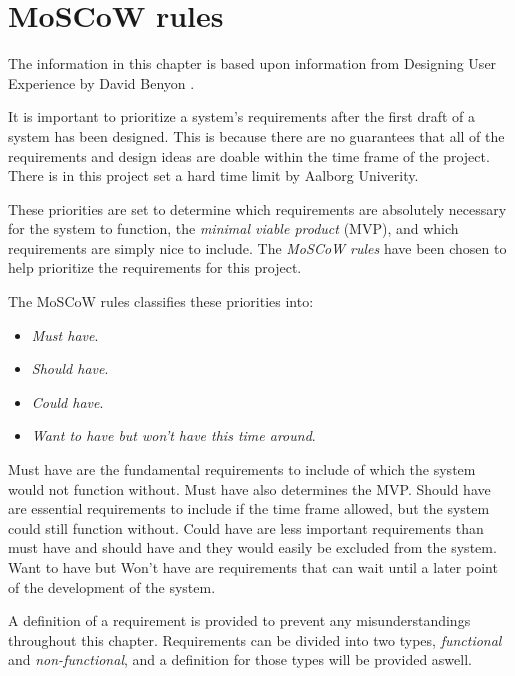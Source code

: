 \section{MoSCoW rules}
The information in this chapter is based upon information from Designing User Experience by David Benyon \cite{Benyon}.

It is important to prioritize a system's requirements after the first draft of a system has been designed.
This is because there are no guarantees that all of the requirements and design ideas are doable within the time frame of the project.
There is in this project set a hard time limit by Aalborg Univerity.

These priorities are set to determine which requirements are absolutely necessary for the system to function, the \textit{minimal viable product} (MVP), and which requirements are simply nice to include.
The \textit{MoSCoW rules} have been chosen to help prioritize the requirements for this project.

The MoSCoW rules classifies these priorities into:

\begin{itemize}
    \item \textit{Must have}.
    \item \textit{Should have}.
    \item \textit{Could have}.
    \item \textit{Want to have but won’t have this time around}.
\end{itemize}

Must have are the fundamental requirements to include of which the system would not function without.
Must have also determines the MVP.
Should have are essential requirements to include if the time frame allowed, but the system could still function without.
Could have are less important requirements than must have and should have and they would easily be excluded from the system.
Want to have but Won't have are requirements that can wait until a later point of the development of the system.

A definition of a requirement is provided to prevent any misunderstandings throughout this chapter.
Requirements can be divided into two types, \textit{functional} and \textit{non-functional}, and a definition for those types will be provided aswell.

